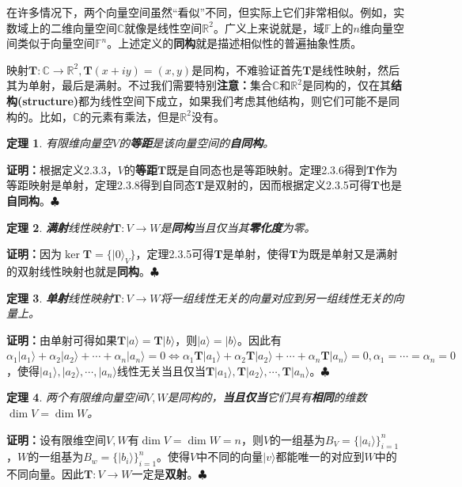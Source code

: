 \documentclass[mathserif,hyperref,UTF8,openany,b5paper]{ctexbook}
\newtheorem{thm}{定理}[section]
\begin{document}
在许多情况下，两个向量空间虽然“看似”不同，但实际上它们非常相似。例如，实数域上的二维向量空间$\mathbb{C}$就像是线性空间$\mathbb{R}^2$。广义上来说就是，域$\mathbb{F}$上的$n$维向量空间类似于向量空间$\mathbb{F}^n$。上述定义的\textbf{同构}就是描述相似性的普遍抽象性质。

映射$\mathbf{T}:\mathbb{C}\xrightarrow{}\mathbb{R}^2,\mathbf{T}(x+iy)=(x,y)$是同构，不难验证首先$\mathbf{T}$是线性映射，然后其为单射，最后是满射。不过我们需要特别\textbf{注意：}集合$\mathbb{C}$和$\mathbb{R}^2$是同构的，仅在其\textbf{结构(structure)}都为线性空间下成立，如果我们考虑其他结构，则它们可能不是同构的。比如，$\mathbb{C}$的元素有乘法，但是$\mathbb{R}^2$没有。
\begin{thm}
有限维向量空$V$的\textbf{等距}是该向量空间的\textbf{自同构}。
\end{thm}
\textbf{证明：}根据定义2.3.3，$V$的\textbf{等距}$\mathbf{T}$既是自同态也是等距映射。定理2.3.6得到$\mathbf{T}$作为等距映射是单射，定理2.3.8得到自同态$\mathbf{T}$是双射的，因而根据定义2.3.5可得$\mathbf{T}$也是\textbf{自同构}。$\clubsuit$
\begin{thm}
\textbf{满射}线性映射$\mathbf{T}:V\xrightarrow{}W$是\textbf{同构}当且仅当其\textbf{零化度}为零。
\end{thm}
\textbf{证明：}因为$\ker\mathbf{T}=\{|0\rangle_V\}$，定理2.3.5可得$\mathbf{T}$是单射，使得$\mathbf{T}$为既是单射又是满射的双射线性映射也就是\textbf{同构}。$\clubsuit$
\begin{thm}
\textbf{单射}线性映射$\mathbf{T}:V\xrightarrow{}W$将一组线性无关的向量对应到另一组线性无关的向量上。
\end{thm}
\textbf{证明：}由单射可得如果$\mathbf{T}|a\rangle=\mathbf{T}|b\rangle$，则$|a\rangle=|b\rangle$。因此有$\alpha_1|a_1\rangle+\alpha_2|a_2\rangle+\cdots+\alpha_n|a_n\rangle=0 \Leftrightarrow \alpha_1\mathbf{T}|a_1\rangle+\alpha_2\mathbf{T}|a_2\rangle+\cdots+\alpha_n\mathbf{T}|a_n\rangle=0, \alpha_1=\cdots=\alpha_n=0$，使得$|a_1\rangle,|a_2\rangle,\cdots,|a_n\rangle$线性无关当且仅当$\mathbf{T}|a_1\rangle,\mathbf{T}|a_2\rangle,\cdots,\mathbf{T}|a_n\rangle$。$\clubsuit$
\begin{thm}
两个有限维向量空间$V,W$是同构的，\textbf{当且仅当}它们具有\textbf{相同}的维数$\dim V = \dim W$。
\end{thm}
\textbf{证明：}设有限维空间$V,W$有$\dim V =\dim W =n$，则$V$的一组基为$B_V=\{|a_i\rangle\}^n_{i=1}$，$W$的一组基为$B_w=\{|b_i\rangle\}^n_{i=1}$。使得$V$中不同的向量$|v\rangle$都能唯一的对应到$W$中的不同向量。因此$\mathbf{T}:V\xrightarrow{}W$一定是\textbf{双射}。$\clubsuit$
\end{document}
